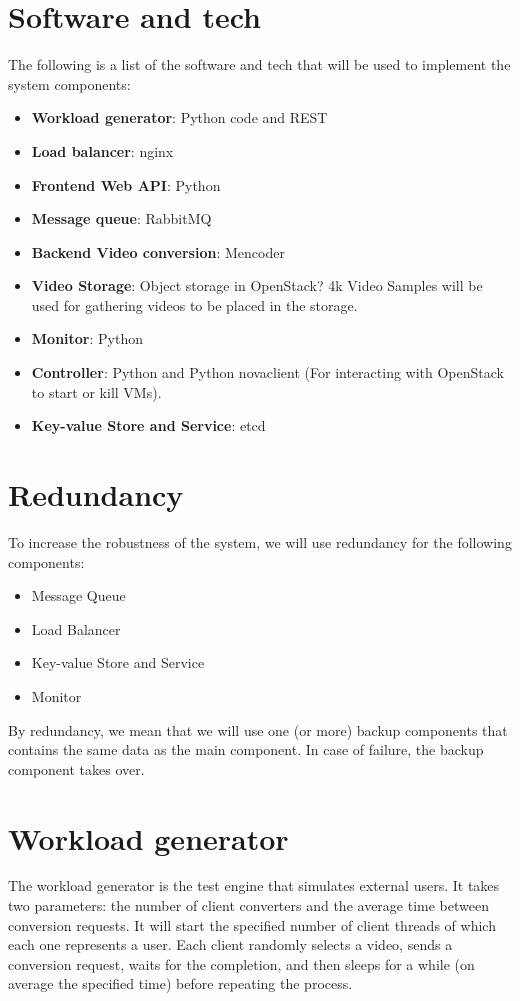 \documentclass[a4paper, 10pt, english]{article}
\begin{document}
\section{Software and tech}
The following is a list of the software and tech that will be used to implement the system components:
\begin{itemize}
	\item \textbf{Workload generator}: Python code and REST
	\item \textbf{Load balancer}: nginx
	\item \textbf{Frontend Web API}: Python
	\item \textbf{Message queue}: RabbitMQ
	\item \textbf{Backend Video conversion}: Mencoder
	\item \textbf{Video Storage}: Object storage in OpenStack? 4k Video Samples will be used for gathering videos to be placed in the storage.
	\item \textbf{Monitor}: Python
	\item \textbf{Controller}: Python and Python novaclient (For interacting with OpenStack to start or kill VMs). 
	\item \textbf{Key-value Store and Service}: etcd
\end{itemize}

\section{Redundancy}
To increase the robustness of the system, we will use redundancy for the following components:
\begin{itemize}
	\item Message Queue
	\item Load Balancer
	\item Key-value Store and Service
	\item Monitor
\end{itemize}
By redundancy, we mean that we will use one (or more) backup components that contains the same data as the main component. In case of failure, the backup component takes over.
\section{Workload generator} \label{sec:WG}
The workload generator is the test engine that simulates external users. It takes two parameters: the number of client converters and the average time between conversion requests. It will start the specified number of client threads of which each one represents a user. Each client randomly selects a video, sends a conversion request, waits for the completion, and then sleeps for a while (on average the specified time) before repeating the process.
\end{document}
